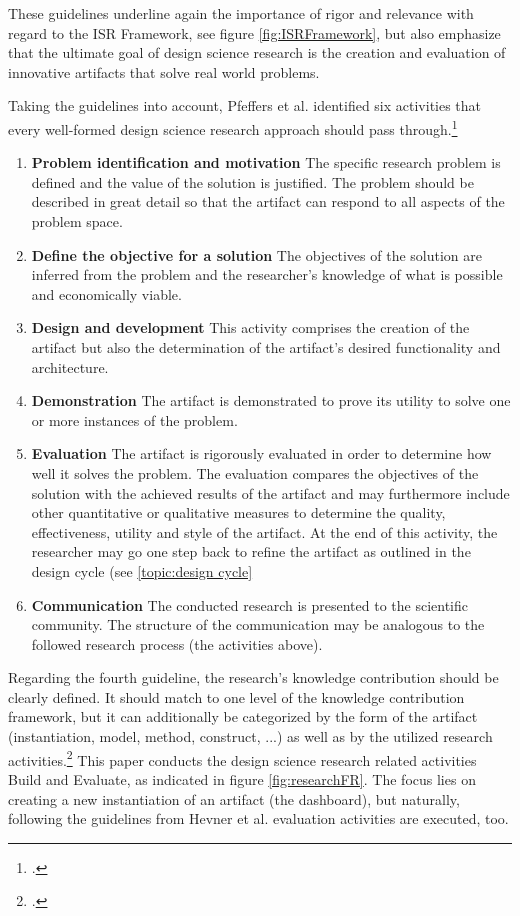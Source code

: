 These guidelines underline again the importance of rigor and relevance with regard to the ISR Framework, see figure \ref{fig:ISRFramework}, but also emphasize that the ultimate goal of design science research is the creation and evaluation of innovative artifacts that solve real world problems.

Taking the guidelines into account, Pfeffers et al. identified six activities that every well-formed design science research approach should pass through.\footcite[Cf.][pp.12-18]{PfeffersDesignScienceResearch2007}

\begin{enumerate}
    \item \textbf{Problem identification and motivation} The specific research problem is defined and the value of the solution is justified. The problem should be described in great detail so that the artifact can respond to all aspects of the problem space.
    \item \textbf{Define the objective for a solution} The objectives of the solution are inferred from the problem and the researcher's knowledge of what is possible and economically viable.
    \item \textbf{Design and development} This activity comprises the creation of the artifact but also the determination of the artifact's desired functionality and architecture. 
    \item \textbf{Demonstration} The artifact is demonstrated to prove its utility to solve one or more instances of the problem.
    \item \textbf{Evaluation} The artifact is rigorously evaluated in order to determine how well it solves the problem. The evaluation compares the objectives of the solution with the achieved results of the artifact and may furthermore include other quantitative or qualitative measures to determine the quality, effectiveness, utility and style of the artifact. At the end of this activity, the researcher may go one step back to refine the artifact as outlined in the design cycle (see \ref{topic:design cycle}
    \item \textbf{Communication} The conducted research is presented to the scientific community. The structure of the communication may be analogous to the followed research process (the activities above).
\end{enumerate}

Regarding the fourth guideline, the research's knowledge contribution should be clearly defined. It should match to one level of the knowledge contribution framework, but it can additionally be categorized by the form of the artifact (instantiation, model, method, construct, ...) as well as by the utilized research activities.\footcite[Cf.][p.255]{MarchDesignnaturalscience1995} This paper conducts the design science research related activities Build and Evaluate, as indicated in figure \ref{fig:researchFR}. The focus lies on creating a new instantiation of an artifact (the dashboard), but naturally, following the guidelines from Hevner et al. evaluation activities are executed, too.

